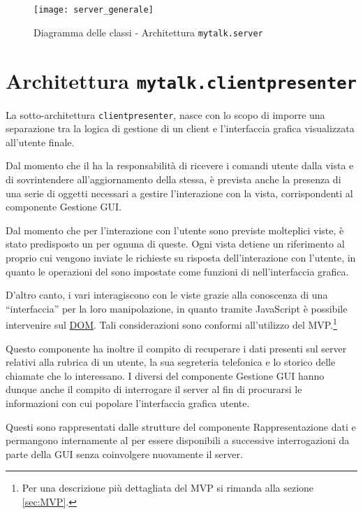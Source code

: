 \begin{figure}[H]
  \centering
  \texttt{[image: server\_generale]}
  \caption{Diagramma delle classi - Architettura \texttt{mytalk.server}}\label{fig:sottoarchserver}
\end{figure}
\clearpage

\section{Architettura \texttt{mytalk.clientpresenter}}\label{sec:clientpresenter}
La sotto-architettura \texttt{clientpresenter}, nasce con lo scopo di imporre una separazione tra la logica di gestione di un client e l'interfaccia grafica visualizzata all'utente finale.

Dal momento che il  ha la responsabilità di ricevere i comandi utente dalla vista e di sovrintendere all'aggiornamento della stessa, è prevista anche la presenza di una serie di oggetti necessari a gestire l'interazione con la vista, corrispondenti al componente \textsf{Gestione GUI}\@.

Dal momento che per l'interazione con l'utente sono previste molteplici viste, è stato predisposto un  per ognuna di queste. Ogni vista detiene un riferimento al proprio  cui vengono inviate le richieste su risposta dell'interazione con l'utente, in quanto le operazioni del  sono impostate come funzioni di  nell'interfaccia grafica.

D'altro canto, i vari  interagiscono con le viste grazie alla conoscenza di una ``interfaccia'' per la loro manipolazione, in quanto tramite JavaScript è possibile intervenire sul \underline{DOM}\@. Tali considerazioni sono conformi all'utilizzo del  MVP.\footnote{%
  Per una descrizione più dettagliata del  MVP si rimanda alla sezione \ref{sec:MVP}\@.
}

Questo componente ha inoltre il compito di recuperare i dati presenti sul server relativi alla rubrica di un utente, la sua segreteria telefonica e lo storico delle chiamate che lo interessano. I diversi  del componente \textsf{Gestione GUI} hanno dunque anche il compito di interrogare il server al fin di procurarsi le informazioni con cui popolare l'interfaccia grafica utente.

Questi sono rappresentati dalle strutture del componente \textsf{Rappresentazione dati} e permangono internamente al  per essere disponibili a successive interrogazioni da parte della GUI senza coinvolgere nuovamente il server.

